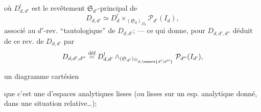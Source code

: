 où $D^!_{d,d'}$ est le revêtement $\mathfrak S_{d'}$-principal de
\[D_{d,d'}\simeq D^!_d\mathbin\times_{(\mathfrak S_d)_{D_d}}\mathcal P_{d'}(I_d),\]
associé au $d'$-rev. ``tautologique'' de $D_{d,d'}$; --- ce qui donne, pour $D_{d,d',d''}$ déduit de ce rev. de $D_{d,d'}$ par
\[D_{d,d',d''}\overset{\text{déf}}{=}D^!_{d,d'}\mathbin\wedge_{(\mathfrak S_{d'})_{D_{d,\unsure{d'|d''}}}}\mathcal P_{d''}(I_{d'}),\]

un  diagramme cartésien


que c'est une  d'espaces  analytiques lisses (ou lisses sur un esp. analytique donné, dans une situation relative\ldots);

